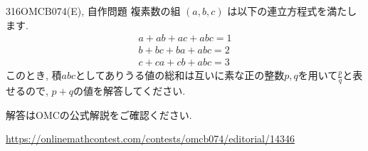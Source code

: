
\begin{prob}{316}{}{OMCB074(E), 自作問題}
    複素数の組 $(a,b,c)$ は以下の連立方程式を満たします.
    \begin{align*}
        a + ab + ac + abc = 1\\
        b + bc + ba + abc = 2\\
        c + ca + cb + abc = 3
    \end{align*}
    このとき, 積$abc$としてありうる値の総和は互いに素な正の整数$p,q$を用いて$\frac{p}{q}$と表せるので, $p+q$の値を解答してください.
\end{prob}

解答はOMCの公式解説をご確認ください.

\url{https://onlinemathcontest.com/contests/omcb074/editorial/14346}
